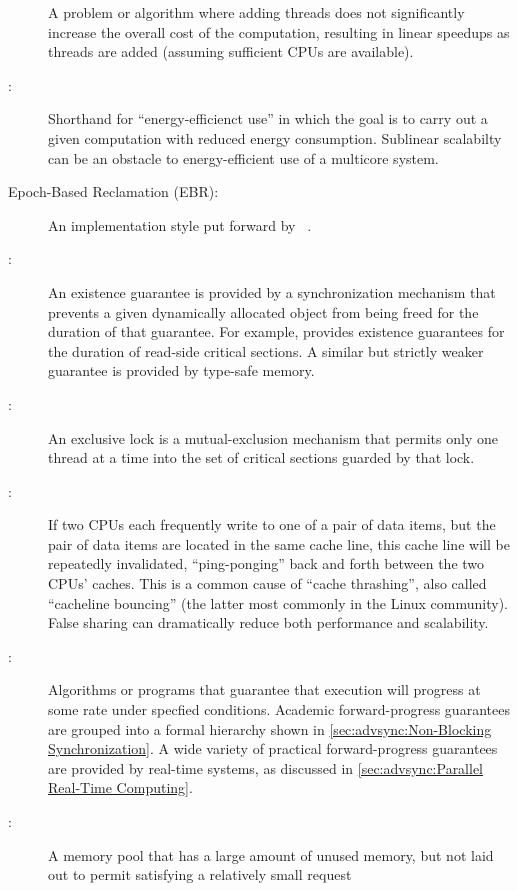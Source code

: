 \begin{description}
	A problem or algorithm where adding threads does not significantly
	increase the overall cost of the computation, resulting in
	linear speedups as threads are added (assuming sufficient
	CPUs are available).
\item[\IXGalth{Energy Efficiency}{energy}{efficiency}:]
	Shorthand for ``energy-efficienct use'' in which the goal is to
	carry out a given computation with reduced energy consumption.
	Sublinear scalabilty can be an obstacle to energy-efficient use
	of a multicore system.
\item[Epoch-Based Reclamation (EBR):]
	An  implementation style put forward by
	~\cite{KeirAnthonyFraserPhD,UCAM-CL-TR-579,KeirFraser2007withoutLocks}.
\item[\IXG{Existence Guarantee}:]
	An existence guarantee is provided by a synchronization mechanism
	that prevents a given dynamically allocated object from being
	freed for the duration of that guarantee.
	For example,  provides existence guarantees for the duration
	of  read-side critical sections.
	A similar but strictly weaker guarantee is provided by
	type-safe memory.
\item[\IXGh{Exclusive}{Lock}:]
	An exclusive lock is a mutual-exclusion mechanism that
	permits only one thread at a time into the
	set of critical sections guarded by that lock.
\item[\IXG{False Sharing}:]
	If two CPUs each frequently write to one of a pair of data items,
	but the pair of data items are located in the same cache line,
	this cache line will be repeatedly invalidated, ``ping-ponging''
	back and forth between the two CPUs' caches.
	This is a common cause of ``cache thrashing'', also called
	``cacheline bouncing'' (the latter most commonly in the Linux
	community).
	False sharing can dramatically reduce both performance and
	scalability.
\item[\IXG{Forward-Progress Guarantee}:]
	Algorithms or programs that guarantee that execution will
	progress at some rate under specfied conditions.
	Academic forward-progress guarantees are grouped into a
	formal hierarchy shown in
	\cref{sec:advsync:Non-Blocking Synchronization}.
	A wide variety of practical forward-progress guarantees are
	provided by real-time systems, as discussed in
	\cref{sec:advsync:Parallel Real-Time Computing}.
\item[\IXG{Fragmentation}:]
	A memory pool that has a large amount of unused memory, but
	not laid out to permit satisfying a relatively small request

\end{description}
